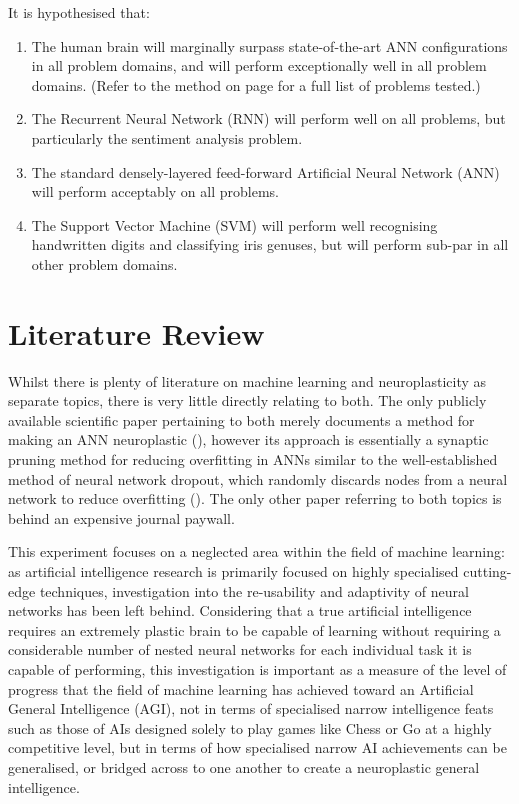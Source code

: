 \documentclass[]{report}
\begin{document}
It is hypothesised that:
\begin{enumerate}
	\item The human brain will marginally surpass state-of-the-art ANN configurations in all problem domains, and will perform exceptionally well in all problem domains. (Refer to the method on page \pageref{itm:Method} for a full list of problems tested.)
	\item The Recurrent Neural Network (RNN) will perform well on all problems, but particularly the sentiment analysis problem.
	\item The standard densely-layered feed-forward Artificial Neural Network (ANN) will perform acceptably on all problems.
	\item The Support Vector Machine (SVM) will perform well recognising handwritten digits and classifying iris genuses, but will perform sub-par in all other problem domains.
\end{enumerate}

\section{Literature Review}

Whilst there is plenty of literature on machine learning and neuroplasticity as separate topics, there is very little directly relating to both. The only publicly available scientific paper pertaining to both merely documents a method for making an ANN neuroplastic (\cite{perwej12}), however its approach is essentially a synaptic pruning method for reducing overfitting in ANNs similar to the well-established method of neural network dropout, which randomly discards nodes from a neural network to reduce overfitting (\cite{dropout14}). The only other paper referring to both topics is behind an expensive journal paywall.

This experiment focuses on a neglected area within the field of machine learning: as artificial intelligence research is primarily focused on highly specialised cutting-edge techniques, investigation into the re-usability and adaptivity of neural networks has been left behind. Considering that a true artificial intelligence requires an extremely plastic brain to be capable of learning without requiring a considerable number of nested neural networks for each individual task it is capable of performing, this investigation is important as a measure of the level of progress that the field of machine learning has achieved toward an Artificial General Intelligence (AGI), not in terms of specialised narrow intelligence feats such as those of AIs designed solely to play games like Chess or Go at a highly competitive level, but in terms of how specialised narrow AI achievements can be generalised, or bridged across to one another to create a neuroplastic general intelligence.
\end{document}
